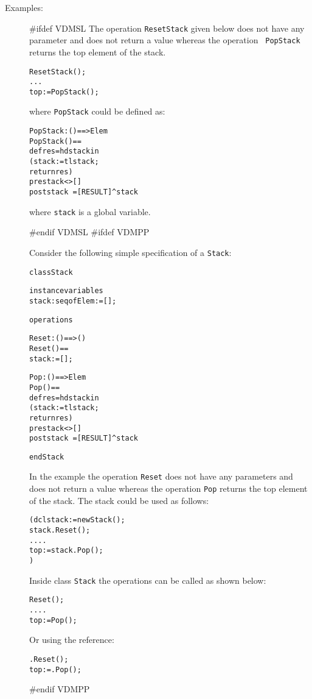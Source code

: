 \documentclass[\pformat,12pt]{article}
\begin{document}
\begin{description}
\item[Examples:] \mbox{} 
#ifdef VDMSL
  The operation {\tt ResetStack} given below does not
  have any parameter and does not return a value whereas the operation {\tt
    PopStack} returns the top element of the stack.
  \begin{alltt}
    ResetStack();
    ...
    top := PopStack();
  \end{alltt}
  where {\tt PopStack} could be defined as:
  \begin{alltt}
    PopStack: () ==> Elem
    PopStack() ==
      def res = hd stack in
       (stack := tl stack;
        return res)
    pre stack <> []
    post stack~ = [RESULT] ^ stack
  \end{alltt}
  where {\tt stack} is a global variable.

#endif VDMSL
#ifdef VDMPP

  Consider the following simple specification of a {\tt Stack}:

  \begin{alltt}
  class Stack

  instance variables
    stack: seq of Elem := [];

  operations

    \PUBLIC Reset: () ==> ()
    Reset() ==
      stack := []; 

    \PUBLIC Pop: () ==> Elem
    Pop() ==
      def res = hd stack in
       (stack := tl stack;
        return res)
    pre stack <> []
    post stack~ = [RESULT] ^ stack

  end Stack
  \end{alltt}

  In the example the operation {\tt Reset} does not have any parameters
  and does not return a value whereas the operation {\tt Pop} returns
  the top element of the stack. The stack could be used as follows:
  \begin{alltt}
    ( dcl stack := new Stack();
      stack.Reset();
      ....
      top := stack.Pop();
    )
  \end{alltt}
 
  Inside class {\tt Stack} the operations can be called as shown below:   
  \begin{alltt}
    Reset();
    ....
    top := Pop();
  \end{alltt}
  
  Or using the  reference:
  \begin{alltt}
    .Reset();
    top := .Pop();
  \end{alltt}

#endif VDMPP
\end{description}
\end{document}
